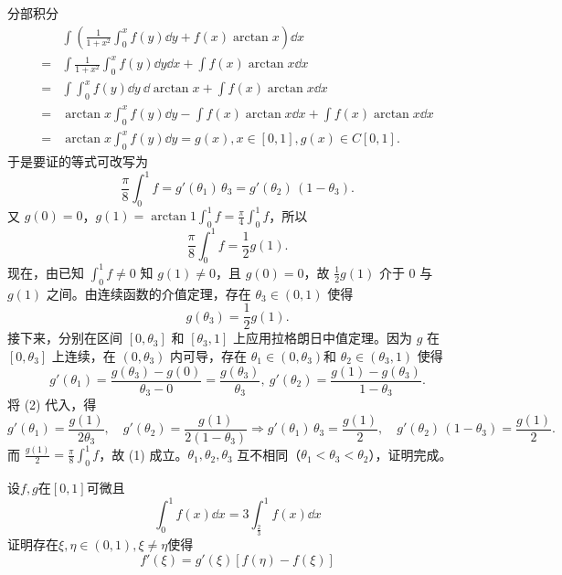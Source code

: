 \begin{solution}
分部积分
\begin{align*}
    &\int\left(\frac{1}{1+x^2}\int_0^xf(y)\dd y+f(x)\arctan x\right)\dd x\\
    =&\int\frac{1}{1+x^2}\int_0^xf(y)\dd y\dd x+\int f(x)\arctan x\dd x\\
    =&\int\int_0^xf(y)\dd y~\dd\arctan x+\int f(x)\arctan x\dd x\\
=&\arctan x\int_0^xf(y)\dd y-\int f(x)\arctan x\dd x+\int f(x)\arctan x\dd x\\
=&\arctan x\int_0^xf(y)\dd y=g(x),x\in[0,1],g(x)\in C\left[0,1\right].
\end{align*}
于是要证的等式可改写为
\[
\frac{\pi}{8}\int_0^1 f = g'(\theta_1)\,\theta_3 = g'(\theta_2)\,(1-\theta_3). \tag{1}
\]
又 $g(0)=0$，$\displaystyle g(1)=\arctan1 \int_0^1 f = \frac{\pi}{4}\int_0^1 f$，所以
\[
\frac{\pi}{8}\int_0^1 f = \frac{1}{2}g(1).
\]
现在，由已知 $\displaystyle\int_0^1 f \neq 0$ 知 $g(1)\neq 0$，且 $g(0)=0$，故 $\frac{1}{2}g(1)$ 介于 $0$ 与 $g(1)$ 之间。由连续函数的介值定理，存在 $\theta_3\in(0,1)$ 使得
\[
g(\theta_3) = \frac{1}{2}g(1). \tag{2}
\]
接下来，分别在区间 $[0,\theta_3]$ 和 $[\theta_3,1]$ 上应用拉格朗日中值定理。因为 $g$ 在 $[0,\theta_3]$ 上连续，在 $(0,\theta_3)$ 内可导，存在 $\theta_1\in(0,\theta_3)$和 $\theta_2\in(\theta_3,1)$ 使得
\[
g'(\theta_1) = \frac{g(\theta_3)-g(0)}{\theta_3-0} = \frac{g(\theta_3)}{\theta_3},~g'(\theta_2) = \frac{g(1)-g(\theta_3)}{1-\theta_3}.
\]
将 (2) 代入，得
\[
g'(\theta_1) = \frac{g(1)}{2\theta_3}, \quad g'(\theta_2) = \frac{g(1)}{2(1-\theta_3)}\Rightarrow g'(\theta_1)\,\theta_3 = \frac{g(1)}{2}, \quad g'(\theta_2)\,(1-\theta_3) = \frac{g(1)}{2}.
\]
而 $\frac{g(1)}{2} = \frac{\pi}{8}\int_0^1 f$，故 (1) 成立。$\theta_1,\theta_2,\theta_3$ 互不相同（$\theta_1<\theta_3<\theta_2$），证明完成。
\end{solution}
\newpage
\begin{example}
    设$f,g$在$[0,1]$可微且\[\int_0^1f(x)\dd x=3\int_{\frac23}^1f(x)\dd x\]证明存在$\xi,\eta\in(0,1),\xi\neq\eta$使得\[f'(\xi)=g'(\xi)[f(\eta)-f(\xi)]\]
\end{example}
